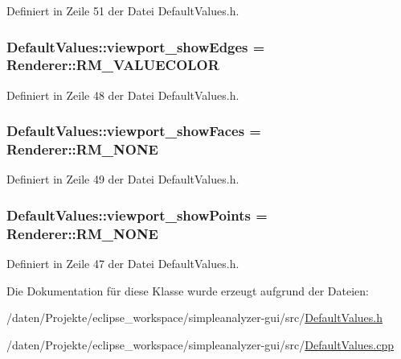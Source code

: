 Definiert in Zeile 51 der Datei Default\-Values.\-h.

\hypertarget{classDefaultValues_abaee1f32df0f3c30194c970c094d841e}{
\subsubsection[{viewport\-\_\-show\-Edges}]{ Default\-Values\-::viewport\-\_\-show\-Edges = {\bf Renderer\-::\-R\-M\-\_\-\-V\-A\-L\-U\-E\-C\-O\-L\-O\-R}}}\label{classDefaultValues_abaee1f32df0f3c30194c970c094d841e}


Definiert in Zeile 48 der Datei Default\-Values.\-h.

\hypertarget{classDefaultValues_a10cb0c8b03531c729ee1f5a9cfe255ca}{
\subsubsection[{viewport\-\_\-show\-Faces}]{ Default\-Values\-::viewport\-\_\-show\-Faces = {\bf Renderer\-::\-R\-M\-\_\-\-N\-O\-N\-E}}}\label{classDefaultValues_a10cb0c8b03531c729ee1f5a9cfe255ca}


Definiert in Zeile 49 der Datei Default\-Values.\-h.

\hypertarget{classDefaultValues_a2b2b60d342d0d946036ccddeae5b8a7b}{
\subsubsection[{viewport\-\_\-show\-Points}]{ Default\-Values\-::viewport\-\_\-show\-Points = {\bf Renderer\-::\-R\-M\-\_\-\-N\-O\-N\-E}}}\label{classDefaultValues_a2b2b60d342d0d946036ccddeae5b8a7b}


Definiert in Zeile 47 der Datei Default\-Values.\-h.



Die Dokumentation für diese Klasse wurde erzeugt aufgrund der Dateien\-:\begin{DoxyCompactItemize}
\item 
/daten/\-Projekte/eclipse\-\_\-workspace/simpleanalyzer-\/gui/src/\hyperlink{DefaultValues_8h}{Default\-Values.\-h}\item 
/daten/\-Projekte/eclipse\-\_\-workspace/simpleanalyzer-\/gui/src/\hyperlink{DefaultValues_8cpp}{Default\-Values.\-cpp}\end{DoxyCompactItemize}
